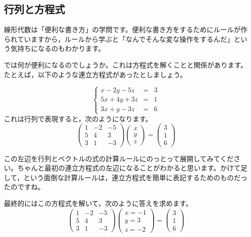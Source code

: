 \documentclass{ltjsbook}
\begin{document}
\subsection{行列と方程式}
線形代数は「便利な書き方」の学問です。便利な書き方をするためにルールが作られていますから，ルールから学ぶと「なんでそんな変な操作をするんだ」という気持ちになるのもわかります。

では何が便利になるのでしょうか。これは方程式を解くことと関係があります。
たとえば，以下のような連立方程式があったとしましょう。

\[
    \left \{
    \begin{array}{lcl}
        x-2y-5z  & = & 3 \\
        5x+4y+3z & = & 1 \\
        3x+y-3z  & = & 6
    \end{array}
    \right .
\]
これは行列で表現すると，次のようになります。
\[
    \begin{pmatrix} 1 & -2 & -5 \\
                5 & 4  & 3  \\
                3 & 1  & -3\end{pmatrix}
    \begin{pmatrix} x \\ y \\ z \end{pmatrix}
    =
    \begin{pmatrix} 3 \\ 1 \\ 6 \end{pmatrix}
\]

この左辺を行列とベクトルの式の計算ルールにのっとって展開してみてください。ちゃんと最初の連立方程式の左辺になることがわかると思います。かけて足して，という面倒な計算ルールは，連立方程式を簡単に表記するためのものだったのですね。

最終的にはこの方程式を解いて，次のように答えを求めます。
\[
    \begin{pmatrix} 1 & -2 & -5 \\
                5 & 4  & 3  \\
                3 & 1  & -3\end{pmatrix}
    \begin{pmatrix} x=-1 \\ y=3 \\ z=-2 \end{pmatrix}
    =
    \begin{pmatrix} 3 \\ 1 \\ 6 \end{pmatrix}
\]
\end{document}
